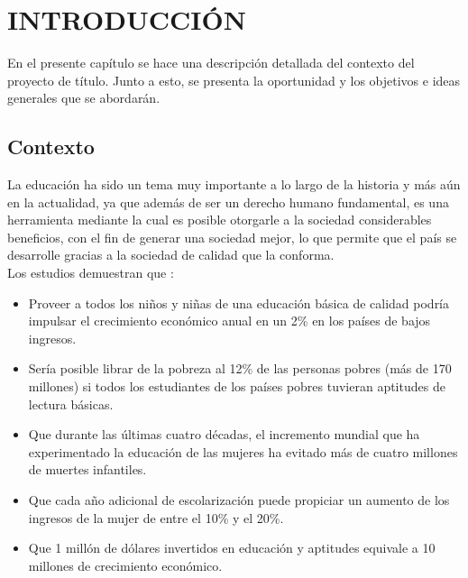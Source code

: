 \chapter{INTRODUCCIÓN}
\label{ch:intro}
En el presente capítulo se hace una descripción detallada del contexto del proyecto de título. Junto a esto, se presenta la oportunidad y los objetivos e ideas generales que se abordarán.

\section{Contexto}
La educación ha sido un tema muy importante a lo largo de la historia y más aún en la actualidad, ya que además de ser un derecho humano fundamental, es una herramienta mediante la cual es posible otorgarle a la sociedad considerables beneficios, con el fin de generar una sociedad mejor, lo que permite que el país se desarrolle gracias a la sociedad de calidad que la conforma. \\


Los estudios demuestran que \cite{unicef}:
\begin{itemize}
\item Proveer a todos los niños y niñas de una educación básica de calidad podría impulsar el crecimiento económico anual en un 2\% en los países de bajos ingresos.
\item Sería posible librar de la pobreza al 12\% de las personas pobres (más de 170 millones) si todos los estudiantes de los países pobres tuvieran aptitudes de lectura básicas.
\item Que durante las últimas cuatro décadas, el incremento mundial que ha experimentado la educación de las mujeres ha evitado más de cuatro millones de muertes infantiles.
\item Que cada año adicional de escolarización puede propiciar un aumento de los ingresos de la mujer de entre el 10\% y el 20\%.
\item Que 1 millón de dólares invertidos en educación y aptitudes equivale a 10 millones de crecimiento económico.
\end{itemize}


